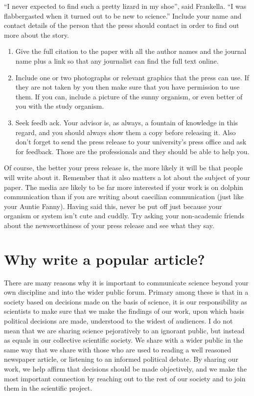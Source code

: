 \documentclass[
]{krantz}
\providecommand{\tightlist}{%
  \setlength{\itemsep}{0pt}\setlength{\parskip}{0pt}}
\renewenvironment{quote}{\begin{VF}}{\end{VF}}
\begin{document}
\begin{quote}
``I never expected to find such a pretty lizard in my shoe'', said Frankella. ``I was flabbergasted when it turned out to be new to science.''
Include your name and contact details of the person that the press should contact in order to find out more about the story.
\end{quote}

\begin{enumerate}
\def\labelenumi{\arabic{enumi}.}
\setcounter{enumi}{7}
\tightlist
\item
  Give the full citation to the paper with all the author names and the journal name plus a link so that any journalist can find the full text online.
\item
  Include one or two photographs or relevant graphics that the press can use. If they are not taken by you then make sure that you have permission to use them. If you can, include a picture of the sunny organism, or even better of you with the study organism.
\item
  Seek feedb ack. Your advisor is, as always, a fountain of knowledge in this regard, and you should always show them a copy before releasing it. Also don't forget to send the press release to your university's press office and ask for feedback. Those are the professionals and they should be able to help you.
\end{enumerate}

Of course, the better your press release is, the more likely it will be that people will write about it. Remember that it also matters a lot about the subject of your paper. The media are likely to be far more interested if your work is on dolphin communication than if you are writing about caecilian communication (just like your Auntie Fanny). Having said this, never be put off just because your organism or system isn't cute and cuddly. Try asking your non-academic friends about the newsworthiness of your press release and see what they say.

\hypertarget{populararticle}{%
\chapter{Why write a popular article?}\label{populararticle}}

There are many reasons why it is important to communicate science beyond your own discipline and into the wider public forum. Primary among these is that in a society based on decisions made on the basis of science, it is our responsibility as scientists to make sure that we make the findings of our work, upon which basis political decisions are made, understood to the widest of audiences. I do not mean that we are sharing science pejoratively to an ignorant public, but instead as equals in our collective scientific society. We share with a wider public in the same way that we share with those who are used to reading a well reasoned newspaper article, or listening to an informed political debate. By sharing our work, we help affirm that decisions should be made objectively, and we make the most important connection by reaching out to the rest of our society and to join them in the scientific project.
\end{document}
